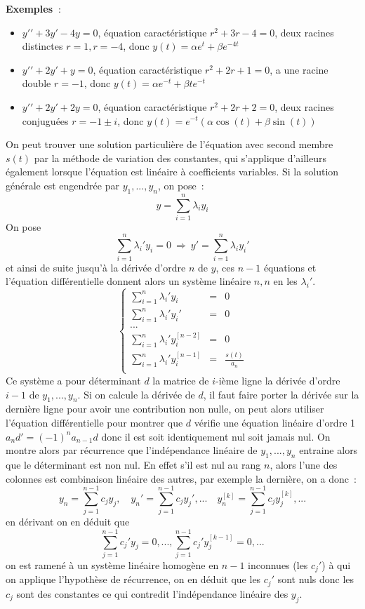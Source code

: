 \documentclass[a4paper,11pt]{book}
\begin{document}
\begin{giacjshere}
{\bf Exemples~}: 
\begin{itemize}
\item $y'{'}+3y'-4y=0$, \'equation caract\'eristique $r^2+3r-4=0$,
deux racines distinctes $r=1, r=-4$, donc $y(t)=\alpha e^t+\beta e^{-4t}$
\item $y'{'}+2y'+y=0$, \'equation caract\'eristique $r^2+2r+1=0$,
a une racine double $r=-1$, donc $y(t)=\alpha e^{-t}+\beta t e^{-t}$
\item $y'{'}+2y'+2y=0$, \'equation caract\'eristique $r^2+2r+2=0$,
deux racines conjugu\'ees $r=-1\pm i$, donc
$y(t)=e^{-t}(\alpha \cos(t)+\beta \sin(t))$
\end{itemize}

On peut trouver une solution particuli\`ere de l'\'equation avec
second membre $s(t)$ par la m\'ethode de variation
des constantes, qui s'applique d'ailleurs
\'egalement lorsque l'\'equation est lin\'eaire \`a coefficients
variables. Si la solution g\'en\'erale est engendr\'ee par
$y_1,...,y_n$, on pose~:
$$ y=\sum_{i=1}^n \lambda_i y_i$$
On pose
$$ \sum_{i=1}^n \lambda_i' y_i=0 \ \Rightarrow \ 
y'=\sum_{i=1}^n \lambda_i y_i'$$
et ainsi de suite jusqu'\`a la d\'eriv\'ee d'ordre $n$ de $y$, ces
$n-1$ \'equations et l'\'equation diff\'erentielle donnent 
alors un syst\`eme lin\'eaire $n,n$ en
les $\lambda_i'$. 
$$ \left\{ \begin{array}{ccc}
\sum_{i=1}^n \lambda_i' y_i &=&0\\
\sum_{i=1}^n \lambda_i' y_i' &=&0\\
...\\
\sum_{i=1}^n \lambda_i' y_i^{[n-2]} &=&0\\
\sum_{i=1}^n \lambda_i' y_i^{[n-1]} &=& \frac{s(t)}{a_n}\\
\end{array} \right. $$
Ce syst\`eme a pour d\'eterminant $d$ la matrice
de $i$-i\`eme ligne la d\'eriv\'ee d'ordre $i-1$ de $y_1,...,y_n$.
Si on calcule la d\'eriv\'ee de $d$, il faut faire
porter la d\'eriv\'ee sur la derni\`ere ligne pour avoir une
contribution non nulle, on peut alors utiliser l'\'equation
diff\'erentielle pour montrer que $d$ v\'erifie une
\'equation lin\'eaire d'ordre 1 $a_nd'=(-1)^na_{n-1}d$ donc il est soit 
identiquement nul soit jamais nul. 
On montre alors par r\'ecurrence que l'ind\'ependance lin\'eaire
de $y_1,...,y_n$ entraine alors
que le d\'eterminant est non nul.
En effet s'il est nul au rang $n$, alors l'une
des colonnes est combinaison lin\'eaire des autres, par exemple
la derni\`ere, on a donc~:
$$y_n= \sum_{j=1}^{n-1} c_j y_j, \quad y_n'=\sum_{j=1}^{n-1} c_j y_j', ...
\quad y_n^{[k]}=\sum_{j=1}^{n-1} c_j y_j^{[k]}, ...$$
en d\'erivant on en d\'eduit que
$$ \sum_{j=1}^{n-1} c_j' y_j=0, ..., \sum_{j=1}^{n-1} c_j' y_j^{[k-1]}=0,... $$
on est ramen\'e \`a un syst\`eme lin\'eaire homog\`ene en $n-1$ inconnues
(les $c_j'$) \`a qui on applique l'hypoth\`ese de r\'ecurrence, 
on en d\'eduit que
les $c_j'$ sont nuls donc les $c_j$ sont des constantes ce qui contredit
l'ind\'ependance lin\'eaire des $y_j$.


\end{giacjshere}
\end{document}
